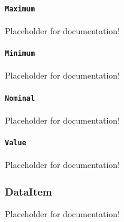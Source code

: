 \paragraph{\texttt{Maximum}}\mbox{}
\newline\tab Placeholder for documentation!

\paragraph{\texttt{Minimum}}\mbox{}
\newline\tab Placeholder for documentation!

\paragraph{\texttt{Nominal}}\mbox{}
\newline\tab Placeholder for documentation!

\paragraph{\texttt{Value}}\mbox{}
\newline\tab Placeholder for documentation!
\FloatBarrier
\subsubsection{DataItem}
  \label{type:DataItem}

\FloatBarrier

Placeholder for documentation!

